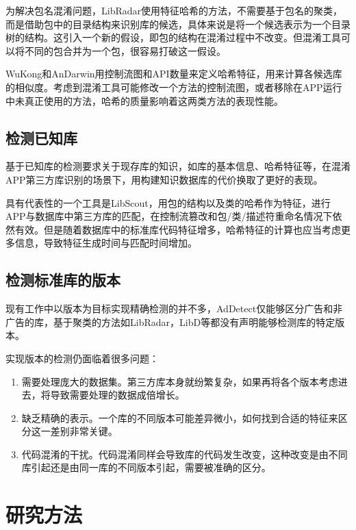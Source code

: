 为解决包名混淆问题，LibRadar\cite{ma2016libradar}使用特征哈希的方法，不需要基于包名的聚类，而是借助包中的目录结构来识别库的候选，具体来说是将一个候选表示为一个目录树的结构。这引入一个新的假设，即包的结构在混淆过程中不改变。但混淆工具可以将不同的包合并为一个包，很容易打破这一假设。

WuKong\cite{wang2015wukong}和AnDarwin\cite{crussell2014andarwin}用控制流图和API数量来定义哈希特征，用来计算各候选库的相似度。考虑到混淆工具可能修改一个方法的控制流图，或者移除在APP运行中未真正使用的方法，哈希的质量影响着这两类方法的表现性能。


\section{检测已知库}

基于已知库的检测要求关于现存库的知识，如库的基本信息、哈希特征等，在混淆APP第三方库识别的场景下，用构建知识数据库的代价换取了更好的表现。

具有代表性的一个工具是LibScout\cite{backes2016reliable}，用包的结构以及类的哈希作为特征，进行APP与数据库中第三方库的匹配，在控制流篡改和包/类/描述符重命名情况下依然有效。但是随着数据库中的标准库代码特征增多，哈希特征的计算也应当考虑更多信息，导致特征生成时间与匹配时间增加。



\section{检测标准库的版本}

现有工作中以版本为目标实现精确检测的并不多，AdDetect\cite{narayanan2014addetect}仅能够区分广告和非广告的库，基于聚类的方法如LibRadar\cite{ma2016libradar}，LibD\cite{li2017libd}等都没有声明能够检测库的特定版本。

实现版本的检测仍面临着很多问题：
\begin{enumerate}
\item{需要处理庞大的数据集。第三方库本身就纷繁复杂，如果再将各个版本考虑进去，将导致需要处理的数据成倍增长。}
\item{缺乏精确的表示。一个库的不同版本可能差异微小，如何找到合适的特征来区分这一差别非常关键。}
\item{代码混淆的干扰。代码混淆同样会导致库的代码发生改变，这种改变是由不同库引起还是由同一库的不同版本引起，需要被准确的区分。}
\end{enumerate}



\chapter{研究方法}

